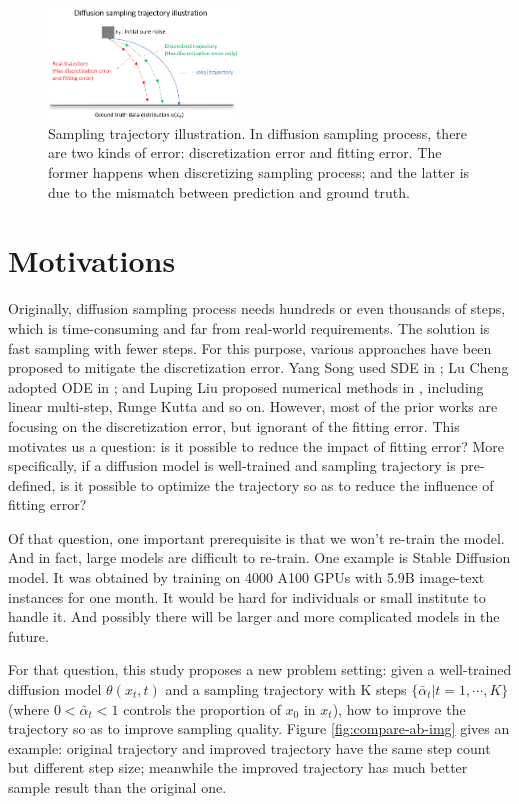 \begin{figure}[t] 
\centering
\includegraphics[width=0.45\textwidth]{figure/Error_discretization_vs_prediction.png}
\caption{Sampling trajectory illustration. In diffusion sampling process, there are two kinds of error: discretization error and fitting error. 
    The former happens when discretizing sampling process; and the latter is due to the mismatch between prediction and ground truth.}
\label{fig:error-d-vs-p}
\end{figure}

\section{Motivations}
Originally, diffusion sampling process needs hundreds or even thousands of steps, which is time-consuming and far from real-world requirements. The solution is fast sampling with fewer steps.
For this purpose, various approaches have been proposed to mitigate the discretization error. Yang Song used SDE in \cite{song2020score}; Lu Cheng adopted ODE in \cite{lu2022dpm}; and Luping Liu proposed numerical methods in \cite{liu2022pndm}, including linear multi-step, Runge Kutta\cite{runge_kutta} and so on. However, most of the prior works are focusing on the discretization error, but ignorant of the fitting error.
This motivates us a question: is it possible to reduce the impact of fitting error? More specifically, if a diffusion model is well-trained and sampling trajectory is pre-defined, is it possible to optimize the trajectory so as to reduce the influence of fitting error?

Of that question, one important prerequisite is that we won't re-train the model. And in fact, large models are difficult to re-train. One example is Stable Diffusion \cite{url_dpm} model. It was obtained by training on 4000 A100 GPUs with 5.9B image-text instances for one month. It would be hard for individuals or small institute to handle it. And possibly there will be larger and more complicated models in the future.

For that question, this study proposes a new problem setting: given a well-trained diffusion model $\theta(x_t, t)$ and a sampling trajectory with K steps $\{\bar{\alpha}_t|t=1, \cdots, K\}$ (where $0<\bar{\alpha}_t< 1$ controls the proportion of $x_0$ in $x_t$), how to improve the trajectory so as to improve sampling quality. 
Figure \ref{fig:compare-ab-img} gives an example: original trajectory and improved trajectory have the same step count but different step size; meanwhile the improved trajectory has much better sample result than the original one.

